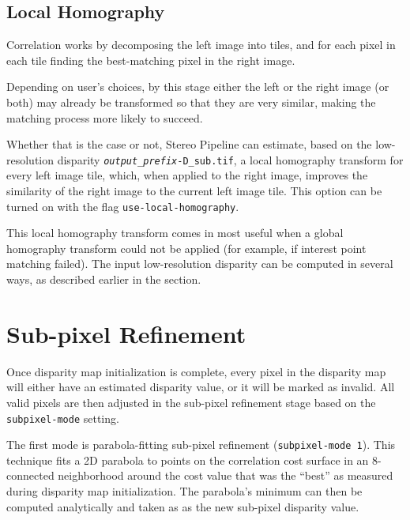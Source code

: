 \subsection{Local Homography}
\label{sec:local_hom}

Correlation works by decomposing the left image into tiles, and for each
pixel in each tile finding the best-matching pixel in the right image.

Depending on user's choices, by this stage either the left or the right
image (or both) may already be transformed so that they are very
similar, making the matching process more likely to succeed.

Whether that is the case or not, Stereo Pipeline can estimate, based on
the low-resolution disparity
\texttt{\textit{output\_prefix}-D\_sub.tif}, a local homography transform
for every left image tile, which, when applied to the right image,
improves the similarity of the right image to the current left image tile. This
option can be turned on with the flag \texttt{use-local-homography}.

This local homography transform comes in most useful when a global
homography transform could not be applied (for example, if interest
point matching failed). The input low-resolution disparity can be
computed in several ways, as described earlier in the section.


\section{Sub-pixel Refinement}
\label{sec:subpixel}

Once disparity map initialization is complete, every pixel in the
disparity map will either have an estimated disparity value, or it
will be marked as invalid.  All valid pixels are then adjusted in the
sub-pixel refinement stage based on the \texttt{subpixel-mode}
setting. %

The first mode is parabola-fitting sub-pixel refinement
(\texttt{subpixel-mode 1}).  This technique fits a 2D parabola to
points on the correlation cost surface in an 8-connected neighborhood
around the cost value that was the ``best'' as measured during
disparity map initialization. The parabola's minimum can then be
computed analytically and taken as as the new sub-pixel disparity
value.


